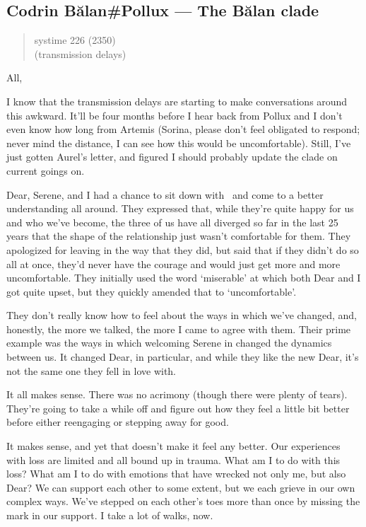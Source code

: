 \hypertarget{codrin-bux103lanpollux-the-bux103lan-clade}{%
\subsection{Codrin Bălan\#Pollux — The Bălan clade}\label{codrin-bux103lanpollux-the-bux103lan-clade}}

\begin{quote}
systime 226 (2350)\\
(transmission delays)
\end{quote}

All,

I know that the transmission delays are starting to make conversations around this awkward. It'll be four months before I hear back from Pollux and I don't even know how long from Artemis (Sorina, please don't feel obligated to respond; never mind the distance, I can see how this would be uncomfortable). Still, I've just gotten Aurel's letter, and figured I should probably update the clade on current goings on.

Dear, Serene, and I had a chance to sit down with \Partner\ and come to a better understanding all around. They expressed that, while they're quite happy for us and who we've become, the three of us have all diverged so far in the last 25 years that the shape of the relationship just wasn't comfortable for them. They apologized for leaving in the way that they did, but said that if they didn't do so all at once, they'd never have the courage and would just get more and more uncomfortable. They initially used the word `miserable' at which both Dear and I got quite upset, but they quickly amended that to `uncomfortable'.

They don't really know how to feel about the ways in which we've changed, and, honestly, the more we talked, the more I came to agree with them. Their prime example was the ways in which welcoming Serene in changed the dynamics between us. It changed Dear, in particular, and while they like the new Dear, it's not the same one they fell in love with.

It all makes sense. There was no acrimony (though there were plenty of tears). They're going to take a while off and figure out how they feel a little bit better before either reengaging or stepping away for good.

It makes sense, and yet that doesn't make it feel any better. Our experiences with loss are limited and all bound up in trauma. What am I to do with this loss? What am I to do with emotions that have wrecked not only me, but also Dear? We can support each other to some extent, but we each grieve in our own complex ways. We've stepped on each other's toes more than once by missing the mark in our support. I take a lot of walks, now.

